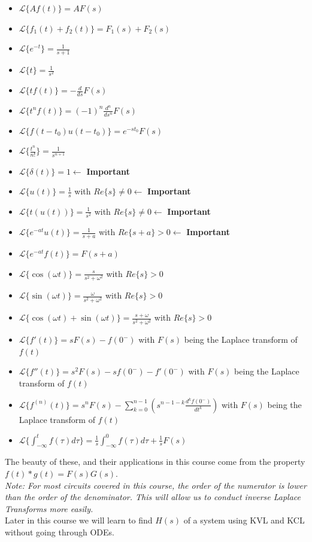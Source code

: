 \documentclass[nobib]{tufte-handout}
\begin{document}
\begin{itemize}
    \item $\mathcal{L}\{Af(t)\} = AF(s)$
    \item $\mathcal{L}\{f_1(t)+f_2(t)\} = F_1(s)+F_2(s)$
    \item $\mathcal{L}\{e^{-t}\} = \frac{1}{s+1}$
    \item $\mathcal{L}\{t\} = \frac{1}{s^2}$
    \item $\mathcal{L}\{tf(t)\} = -\frac{d}{ds}F(s)$
    \item $\mathcal{L}\{t^n f(t)\} = (-1)^n\frac{d^n}{ds^n}F(s)$
    \item $\mathcal{L}\{f(t-t_0)u(t-t_0)\} = e^{-st_0}F(s)$
    \item $\mathcal{L}\{\frac{t^n}{n!}\} = \frac{1}{s^{n+1}}$
    \item $\mathcal{L}\{\delta(t)\} = 1 \leftarrow$ \textbf{Important}
    \item $\mathcal{L}\{u(t)\} = \frac{1}{s}$ with $Re\{s\}\neq 0 \leftarrow$ \textbf{Important}
    \item $\mathcal{L}\{t(u(t))\} = \frac{1}{s^2}$ with $Re\{s\}\neq 0 \leftarrow$ \textbf{Important}
    \item $\mathcal{L}\{e^{-at}u(t)\} = \frac{1}{s+a}$ with $Re\{s+a\}> 0 \leftarrow$ \textbf{Important}
    \item $\mathcal{L}\{e^{-at}f(t)\} = F(s+a)$
    \item $\mathcal{L}\{\cos(\omega t)\} = \frac{s}{s^2+\omega^2}$ with $Re\{s\}> 0$
    \item $\mathcal{L}\{\sin(\omega t)\} = \frac{\omega}{s^2+\omega^2}$ with $Re\{s\}> 0$
    \item $\mathcal{L}\{\cos(\omega t)+\sin(\omega t)\} = \frac{s+\omega}{s^2+\omega^2}$ with $Re\{s\}> 0$
    \item $\mathcal{L}\{f'(t)\} = sF(s) - f(0^-)$ with $F(s)$ being the Laplace transform of $f(t)$
    \item $\mathcal{L}\{f''(t)\} = s^2F(s) - sf(0^-)-f'(0^-)$ with $F(s)$ being the Laplace transform of $f(t)$
    \item $\mathcal{L}\{f^{(n)}(t)\} = s^n F(s) -\sum_{k=0}^{n-1} (s^{n-1-k}\frac{d^k f(0^-)}{dt^k})$ with $F(s)$ being the Laplace transform of $f(t)$
    \item $\mathcal{L}\{\int_{-\infty}^{t}f(\tau)d\tau\} = \frac{1}{s}\int_{-\infty}^{0} f(\tau) d\tau +\frac{1}{s}F(s)$
\end{itemize}
The beauty of these, and their applications in this course come from the property $f(t)*g(t) = F(s)G(s)$.\\
\textit{Note: For most circuits covered in this course, the order of the numerator is lower than the order of the denominator. This will allow us to conduct inverse Laplace Transforms more easily.}\\
Later in this course we will learn to find $H(s)$ of a system using KVL and KCL without going through ODEs.\\
\end{document}
